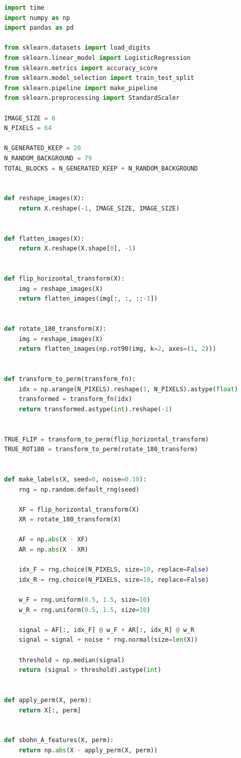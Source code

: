 \documentclass[11pt,a4paper]{report}
\begin{document}
\label{app:ch5-lst3}
\begin{lstlisting}[language=Python]
import time
import numpy as np
import pandas as pd

from sklearn.datasets import load_digits
from sklearn.linear_model import LogisticRegression
from sklearn.metrics import accuracy_score
from sklearn.model_selection import train_test_split
from sklearn.pipeline import make_pipeline
from sklearn.preprocessing import StandardScaler

IMAGE_SIZE = 8
N_PIXELS = 64

N_GENERATED_KEEP = 20
N_RANDOM_BACKGROUND = 79
TOTAL_BLOCKS = N_GENERATED_KEEP + N_RANDOM_BACKGROUND


def reshape_images(X):
    return X.reshape(-1, IMAGE_SIZE, IMAGE_SIZE)


def flatten_images(X):
    return X.reshape(X.shape[0], -1)


def flip_horizontal_transform(X):
    img = reshape_images(X)
    return flatten_images(img[:, :, ::-1])


def rotate_180_transform(X):
    img = reshape_images(X)
    return flatten_images(np.rot90(img, k=2, axes=(1, 2)))


def transform_to_perm(transform_fn):
    idx = np.arange(N_PIXELS).reshape(1, N_PIXELS).astype(float)
    transformed = transform_fn(idx)
    return transformed.astype(int).reshape(-1)


TRUE_FLIP = transform_to_perm(flip_horizontal_transform)
TRUE_ROT180 = transform_to_perm(rotate_180_transform)


def make_labels(X, seed=0, noise=0.10):
    rng = np.random.default_rng(seed)

    XF = flip_horizontal_transform(X)
    XR = rotate_180_transform(X)

    AF = np.abs(X - XF)
    AR = np.abs(X - XR)

    idx_F = rng.choice(N_PIXELS, size=10, replace=False)
    idx_R = rng.choice(N_PIXELS, size=10, replace=False)

    w_F = rng.uniform(0.5, 1.5, size=10)
    w_R = rng.uniform(0.5, 1.5, size=10)

    signal = AF[:, idx_F] @ w_F + AR[:, idx_R] @ w_R
    signal = signal + noise * rng.normal(size=len(X))

    threshold = np.median(signal)
    return (signal > threshold).astype(int)


def apply_perm(X, perm):
    return X[:, perm]


def sbohn_A_features(X, perm):
    return np.abs(X - apply_perm(X, perm))



\end{lstlisting}
\end{document}
